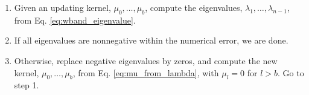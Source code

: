 \documentclass[reprint, superscriptaddress, floatfix]{revtex4-1}
\begin{document}
%
\begin{enumerate}
  \item
    Given an updating kernel, $\mu_0, \dots, \mu_b$,
    compute the eigenvalues,
    $\lambda_1, \dots, \lambda_{n-1}$,
    from Eq. \eqref{eq:wband_eigenvalue}.
  \item
    If all eigenvalues are nonnegative within the numerical error,
    we are done. %
  \item
    Otherwise, replace negative eigenvalues by zeros,
    and compute the new kernel,
    $\mu_0, \dots, \mu_b$, from
    Eq. \eqref{eq:mu_from_lambda},
    with $\mu_l = 0$ for $l > b$.
    Go to step 1.
\end{enumerate}
\end{document}
